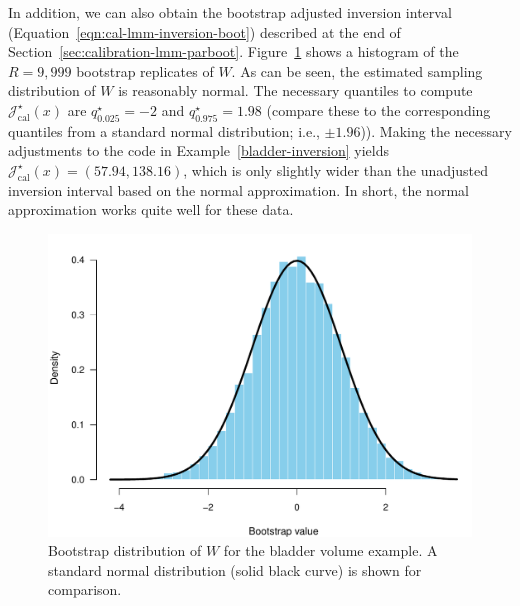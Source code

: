 \documentclass[cmfont,usenames,dvipsnames,leqno]{afit-etd}\usepackage[]{graphicx}\usepackage[]{color}
\makeatletter
\def\maxwidth{ %
  \ifdim\Gin@nat@width>\linewidth
    \linewidth
  \else
    \Gin@nat@width
  \fi
}
\newenvironment{knitrout}{}{} %
\renewenvironment{knitrout}{\begin{singlespace}}{\end{singlespace}}
\newcommand{\boot}{\star} %
\newcommand{\mc}[1]{\ensuremath{\mathcal{#1}}}
\makeatother
\begin{document}
In addition, we can also obtain the bootstrap adjusted inversion interval (Equation~\eqref{eqn:cal-lmm-inversion-boot}) described at the end of Section~\ref{sec:calibration-lmm-parboot}.
Figure~\ref{fig:bladder-parboot-hist1} shows a histogram of the $R = 9,999$ bootstrap replicates of $W$. As can be seen, the estimated sampling distribution of $W$ is reasonably normal. The necessary quantiles to compute $\mc{J}_\mathrm{cal}^\boot(x)$ are $q_{0.025}^\boot = -2$ and $q_{0.975}^\boot = 1.98$ (compare these to the corresponding quantiles from a standard normal distribution; i.e., $\pm 1.96$)). Making the necessary adjustments to the code in Example~\ref{bladder-inversion} yields $\mc{J}_\mathrm{cal}^\boot(x) = (57.94, 138.16)$, which is only slightly wider than the unadjusted inversion interval based on the normal approximation. In short, the normal approximation works quite well for these data.

\begin{knitrout}
\color{fgcolor}\begin{figure}[H]

\includegraphics[width=\maxwidth]{figure/bladder-parboot-hist1} \caption[Bootstrap distribution of $\mc{Q}$ for the bladder volume example]{Bootstrap distribution of $W$ for the bladder volume example. A standard normal distribution (solid black curve) is shown for comparison.\label{fig:bladder-parboot-hist1}}
\end{figure}


\end{knitrout}
\end{document}
